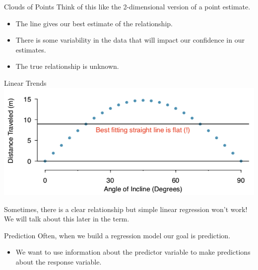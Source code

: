 \begin{frame}{Clouds of Points}
    Think of this like the 2-dimensional version of a point estimate.
    \begin{itemize}
        \item The line gives our best estimate of the relationship.
        \item There is some variability in the data that will impact our confidence in our estimates.
        \item The true relationship is unknown.
    \end{itemize}
\end{frame}

\begin{frame}{Linear Trends}
    \includegraphics[scale=0.4]{images/curvereg.png}
    \vspace{1cm}
    
    Sometimes, there is a clear relationship but simple linear regression won't work! We will talk about this later in the term.
\end{frame}

\begin{frame}{Prediction}
    Often, when we build a regression model our goal is prediction.
    \begin{itemize}
        \item We want to use information about the predictor variable to make predictions about the response variable.
    \end{itemize}
\end{frame}

